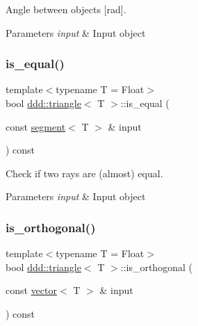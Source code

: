 Angle between objects \mbox{[}rad\mbox{]}. 


\begin{DoxyParams}{Parameters}
{\em input} & Input object \\
\hline
\end{DoxyParams}
\mbox{\label{classddd_1_1triangle_a10426bd9554b5f885775394f90a46851}} 
\subsubsection{\texorpdfstring{is\+\_\+equal()}{is\_equal()}}
{\footnotesize\ttfamily template$<$typename T = Float$>$ \\
bool \hyperlink{classddd_1_1triangle}{ddd\+::triangle}$<$ T $>$\+::is\+\_\+equal (\begin{DoxyParamCaption}\item[{const \hyperlink{classddd_1_1segment}{segment}$<$ T $>$ \&}]{input }\end{DoxyParamCaption}) const\hspace{0.3cm}{\ttfamily [inline]}}



Check if two rays are (almost) equal. 


\begin{DoxyParams}{Parameters}
{\em input} & Input object \\
\hline
\end{DoxyParams}
\mbox{\label{classddd_1_1triangle_a6b750dcea35f2baf2e8a331d66a7fbe0}} 
\subsubsection{\texorpdfstring{is\+\_\+orthogonal()}{is\_orthogonal()}\hspace{0.1cm}{\footnotesize\ttfamily [1/5]}}
{\footnotesize\ttfamily template$<$typename T = Float$>$ \\
bool \hyperlink{classddd_1_1triangle}{ddd\+::triangle}$<$ T $>$\+::is\+\_\+orthogonal (\begin{DoxyParamCaption}\item[{const \hyperlink{classddd_1_1vector}{vector}$<$ T $>$ \&}]{input }\end{DoxyParamCaption}) const\hspace{0.3cm}{\ttfamily [inline]}}




